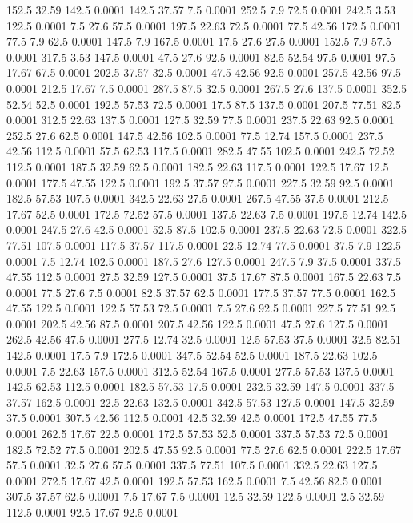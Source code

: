 152.5	32.59	142.5	0.0001
142.5	37.57	7.5	0.0001
252.5	7.9	72.5	0.0001
242.5	3.53	122.5	0.0001
7.5	27.6	57.5	0.0001
197.5	22.63	72.5	0.0001
77.5	42.56	172.5	0.0001
77.5	7.9	62.5	0.0001
147.5	7.9	167.5	0.0001
17.5	27.6	27.5	0.0001
152.5	7.9	57.5	0.0001
317.5	3.53	147.5	0.0001
47.5	27.6	92.5	0.0001
82.5	52.54	97.5	0.0001
97.5	17.67	67.5	0.0001
202.5	37.57	32.5	0.0001
47.5	42.56	92.5	0.0001
257.5	42.56	97.5	0.0001
212.5	17.67	7.5	0.0001
287.5	87.5	32.5	0.0001
267.5	27.6	137.5	0.0001
352.5	52.54	52.5	0.0001
192.5	57.53	72.5	0.0001
17.5	87.5	137.5	0.0001
207.5	77.51	82.5	0.0001
312.5	22.63	137.5	0.0001
127.5	32.59	77.5	0.0001
237.5	22.63	92.5	0.0001
252.5	27.6	62.5	0.0001
147.5	42.56	102.5	0.0001
77.5	12.74	157.5	0.0001
237.5	42.56	112.5	0.0001
57.5	62.53	117.5	0.0001
282.5	47.55	102.5	0.0001
242.5	72.52	112.5	0.0001
187.5	32.59	62.5	0.0001
182.5	22.63	117.5	0.0001
122.5	17.67	12.5	0.0001
177.5	47.55	122.5	0.0001
192.5	37.57	97.5	0.0001
227.5	32.59	92.5	0.0001
182.5	57.53	107.5	0.0001
342.5	22.63	27.5	0.0001
267.5	47.55	37.5	0.0001
212.5	17.67	52.5	0.0001
172.5	72.52	57.5	0.0001
137.5	22.63	7.5	0.0001
197.5	12.74	142.5	0.0001
247.5	27.6	42.5	0.0001
52.5	87.5	102.5	0.0001
237.5	22.63	72.5	0.0001
322.5	77.51	107.5	0.0001
117.5	37.57	117.5	0.0001
22.5	12.74	77.5	0.0001
37.5	7.9	122.5	0.0001
7.5	12.74	102.5	0.0001
187.5	27.6	127.5	0.0001
247.5	7.9	37.5	0.0001
337.5	47.55	112.5	0.0001
27.5	32.59	127.5	0.0001
37.5	17.67	87.5	0.0001
167.5	22.63	7.5	0.0001
77.5	27.6	7.5	0.0001
82.5	37.57	62.5	0.0001
177.5	37.57	77.5	0.0001
162.5	47.55	122.5	0.0001
122.5	57.53	72.5	0.0001
7.5	27.6	92.5	0.0001
227.5	77.51	92.5	0.0001
202.5	42.56	87.5	0.0001
207.5	42.56	122.5	0.0001
47.5	27.6	127.5	0.0001
262.5	42.56	47.5	0.0001
277.5	12.74	32.5	0.0001
12.5	57.53	37.5	0.0001
32.5	82.51	142.5	0.0001
17.5	7.9	172.5	0.0001
347.5	52.54	52.5	0.0001
187.5	22.63	102.5	0.0001
7.5	22.63	157.5	0.0001
312.5	52.54	167.5	0.0001
277.5	57.53	137.5	0.0001
142.5	62.53	112.5	0.0001
182.5	57.53	17.5	0.0001
232.5	32.59	147.5	0.0001
337.5	37.57	162.5	0.0001
22.5	22.63	132.5	0.0001
342.5	57.53	127.5	0.0001
147.5	32.59	37.5	0.0001
307.5	42.56	112.5	0.0001
42.5	32.59	42.5	0.0001
172.5	47.55	77.5	0.0001
262.5	17.67	22.5	0.0001
172.5	57.53	52.5	0.0001
337.5	57.53	72.5	0.0001
182.5	72.52	77.5	0.0001
202.5	47.55	92.5	0.0001
77.5	27.6	62.5	0.0001
222.5	17.67	57.5	0.0001
32.5	27.6	57.5	0.0001
337.5	77.51	107.5	0.0001
332.5	22.63	127.5	0.0001
272.5	17.67	42.5	0.0001
192.5	57.53	162.5	0.0001
7.5	42.56	82.5	0.0001
307.5	37.57	62.5	0.0001
7.5	17.67	7.5	0.0001
12.5	32.59	122.5	0.0001
2.5	32.59	112.5	0.0001
92.5	17.67	92.5	0.0001
